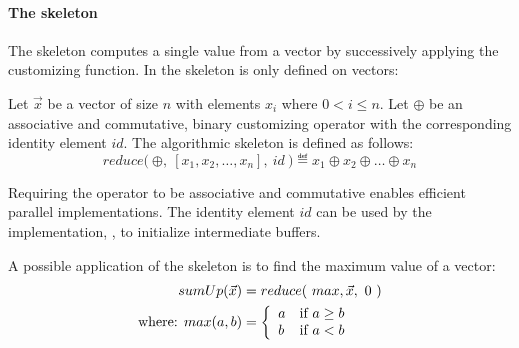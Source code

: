 \paragraph{The \reduce skeleton}
The \reduce skeleton computes a single value from a vector by successively applying the customizing function.
In \SkelCL the \reduce skeleton is only defined on vectors:
\begin{definition}
  \label{definition:reduce}
  Let $\vec{x}$ be a vector of size $n$ with elements $x_i$ where $0 < i \leq n$.
  Let $\oplus$ be an associative and commutative, binary customizing operator with the corresponding identity element $id$.
  The algorithmic skeleton \reduce is defined as follows:
  \begin{equation*}
    reduce \big(\ \oplus,\ [x_1, x_2, \dots, x_n],\ id\ \big)
      \eqdef x_1 \oplus x_2 \oplus \dots \oplus x_n
  \end{equation*}
\end{definition}
\noindent
Requiring the operator to be associative and commutative enables efficient parallel implementations.
The identity element $id$ can be used by the implementation, \eg, to initialize intermediate buffers. %

A possible application of the \reduce skeleton is to find the maximum value of a vector:
\begin{align*}
  sumUp(\vec{x}) &= reduce(\ max, \vec{x},\ 0\ )\\
  \text{where: } max(a, b) &=
    \left\{
      \begin{array}{l l}
      a & \text{if } a \geq b\\
      b & \text{if } a < b
      \end{array}
    \right.
\end{align*}


